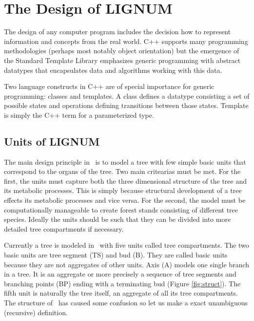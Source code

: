 \chapter{The Design of LIGNUM}

The  design of  any  computer  program includes  the  decision how  to
represent information  and concepts from the real  world. C++ supports
many   programming   methodologies   (perhaps  most   notably   object
orientation)  but  the  emergence  of the  Standard  Template  Library
emphasizes   generic   programming   with  abstract   datatypes   that
encapsulates data and algorithms  working with this data. 

Two language  constructs in C++ are  of special importance for generic
programming: classes  and   templates.   A class  defines   a datatype
consisting   a  set of   possible   states  and  operations   defining
transitions between those states. Template  is simply the C++ term for
a parameterized type.

\section{Units of LIGNUM} 

The main design principle  in  \lignum\ is to  model  a tree with  few
simple basic units that correspond to the organs of the tree. Two main
critearias must  be met.  For the first,  the  units must capture both
the  three  dimensional   structure of  the   tree   and its metabolic
processes.   This is simply because  structural  development of a tree
effects  its metabolic processes and  vice versa.  For the second, the
model must  be  computationally  manageable  to create   forest stands
consisting of  different  tree species.   Ideally  the units should be
such that they can be divided  into more detailed tree compartments if
necessary.

Currently a  tree is modeled in  \lignum\ with five  units called tree
compartments.  The two basic units  are tree segment (TS) and bud (B).
They are called  basic units because they are  not aggregates of other
units.   Axis (A)  models  one single  branch  in a  tree.   It is  an
aggregate or more precisely a  sequence of tree segments and branching
points (BP)  ending with a terminating  bud (Figure \ref{fig:struct}).
The fifth unit  is naturally the tree itself, an  aggregate of all its
tree  compartments.   The  structure   of  \lignum\  has  caused  some
confusion so let us make a exact unambiguous (recursive) definition.


